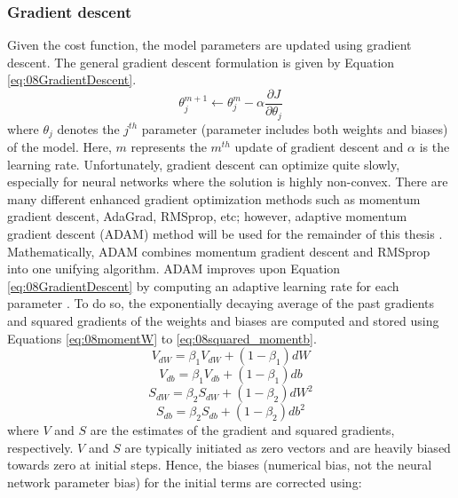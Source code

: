 \subsubsection{Gradient descent}
Given the cost function, the model parameters are updated using gradient descent. The general gradient descent formulation is given by Equation \ref{eq:08GradientDescent}.  
\begin{equation}
    \theta_j^{m+1} \leftarrow \theta_j^{m} - \alpha \frac{\partial J}{\partial \theta_j}
    \label{eq:08GradientDescent}
\end{equation}
where $\theta_j$ denotes the $j^{th}$ parameter (parameter includes both weights and biases) of the model.  Here, $m$ represents the $m^{th}$ update of gradient descent and $\alpha$ is the learning rate. Unfortunately, gradient descent can optimize quite slowly, especially for neural networks where the solution is highly non-convex. There are many different enhanced gradient optimization methods such as momentum gradient descent, AdaGrad, RMSprop, etc; however, adaptive momentum gradient descent (ADAM) method will be used for the remainder of this thesis \cite{ADAM}. Mathematically, ADAM combines momentum gradient descent and RMSprop into one unifying algorithm. ADAM improves upon Equation \ref{eq:08GradientDescent} by computing an adaptive learning rate for each parameter \cite{ADAM}. To do so, the exponentially decaying average of the past gradients and squared gradients of the weights and biases are computed and stored using Equations \ref{eq:08momentW} to \ref{eq:08squared_momentb}.
\begin{equation}
    V_{dW} = \beta_1 V_{dW} + (1 - \beta_1)dW
    \label{eq:08momentW}
\end{equation}
\begin{equation}
    V_{db} = \beta_1 V_{db} + (1 - \beta_1)db
    \label{eq:08momentb}
\end{equation}
\begin{equation}
    S_{dW} = \beta_2 S_{dW} + (1 - \beta_2)dW^2
    \label{eq:08squared_momentW}
\end{equation}
\begin{equation}
    S_{db} = \beta_2 S_{db} + (1 - \beta_2)db^2
    \label{eq:08squared_momentb}
\end{equation}
where $V$ and $S$ are the estimates of the gradient and squared gradients, respectively.  $V$ and $S$ are typically initiated as zero vectors and are heavily biased towards zero at initial steps.  Hence, the biases (numerical bias, not the neural network parameter bias) for the initial terms are corrected using:
